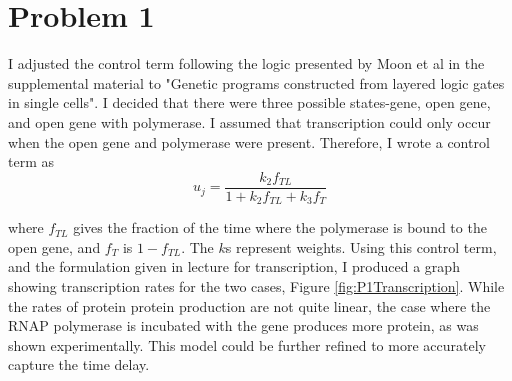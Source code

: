 \documentclass{article}
\begin{document}
 
\section*{Problem 1}
I adjusted the control term following the logic presented by Moon et al in the supplemental material to "Genetic programs constructed from layered logic gates in single cells". I decided that there were three possible states-gene, open gene, and open gene with polymerase. I assumed that transcription could only occur when the open gene and polymerase were present. Therefore, I wrote a control term as
\begin{equation}
u_j = \frac{k_2f_{TL}}{1+k_2f_{TL}+k_3f_T}
\end{equation}

where $f_{TL}$ gives the fraction of the time where the polymerase is bound to the open gene, and $f_T$ is $1-f_{TL}$. The $k$s represent weights. Using this control term, and the formulation given in lecture for transcription, I produced a graph showing transcription rates for the two cases, Figure \ref{fig:P1Transcription}. While the rates of protein protein production are not quite linear, the case where the RNAP polymerase is incubated with the gene produces more protein, as was shown experimentally. This model could be further refined to more accurately capture the time delay.
\end{document}

